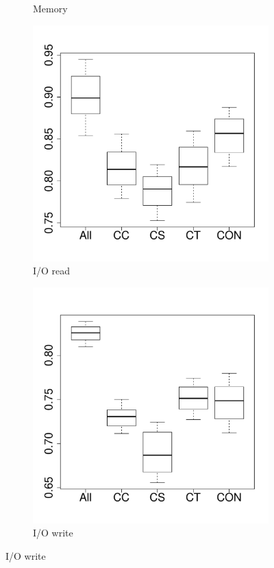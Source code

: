 \begin{figure}[t]
\begin{subfigure}{0.19\textwidth}
                \caption{Memory}
        \end{subfigure}%
        \begin{subfigure}{0.19\textwidth}
                \includegraphics[width=\linewidth]{Figures/ioread-hadoopkeep-importance.pdf}
                \caption{I/O read}
        \end{subfigure}
        \begin{subfigure}{0.19\textwidth}
                \includegraphics[width=\linewidth]{Figures/iowrite-hadoopkeep-importance.pdf}
                \caption{I/O write}
        \end{subfigure}
        

\end{figure}
